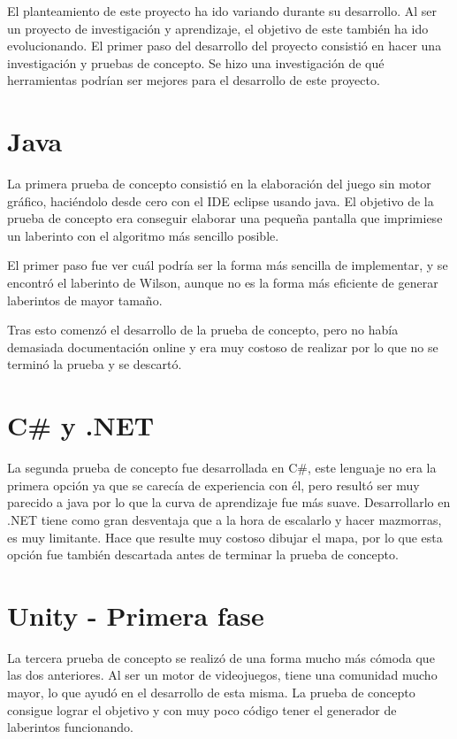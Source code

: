 
El planteamiento de este proyecto ha ido variando durante su desarrollo. Al ser un proyecto de investigación y aprendizaje, el objetivo de este también ha ido evolucionando.
El primer paso del desarrollo del proyecto consistió en hacer una investigación y pruebas de concepto. Se hizo una investigación de qué herramientas podrían ser mejores para el desarrollo de este proyecto.

\section{Java}
La primera prueba de concepto consistió en la elaboración del juego sin motor gráfico, haciéndolo desde cero con el IDE eclipse usando java. El objetivo de la prueba de concepto era conseguir elaborar una pequeña pantalla que imprimiese un laberinto con el algoritmo más sencillo posible. 

El primer paso fue ver cuál podría ser la forma más sencilla de implementar, y se encontró el laberinto de Wilson, aunque no es la forma más eficiente de generar laberintos de mayor tamaño.

Tras esto comenzó el desarrollo de la prueba de concepto, pero no había demasiada documentación online y era muy costoso de realizar por lo que no se terminó la prueba y se descartó.

\section{C\# y .NET}
La segunda prueba de concepto fue desarrollada en C\#, este lenguaje no era la primera opción ya que se carecía de experiencia con él, pero resultó ser muy parecido a java por lo que la curva de aprendizaje fue más suave. Desarrollarlo en .NET tiene como gran desventaja que a la hora de escalarlo y hacer mazmorras, es muy limitante. Hace que resulte muy costoso dibujar el mapa, por lo que esta opción fue también descartada antes de terminar la prueba de concepto.

\section{Unity - Primera fase}
La tercera prueba de concepto se realizó de una forma mucho más cómoda que las dos anteriores. Al ser un motor de videojuegos, tiene una comunidad mucho mayor, lo que ayudó en el desarrollo de esta misma. La prueba de concepto consigue lograr el objetivo y con muy poco código tener el generador de laberintos funcionando.


